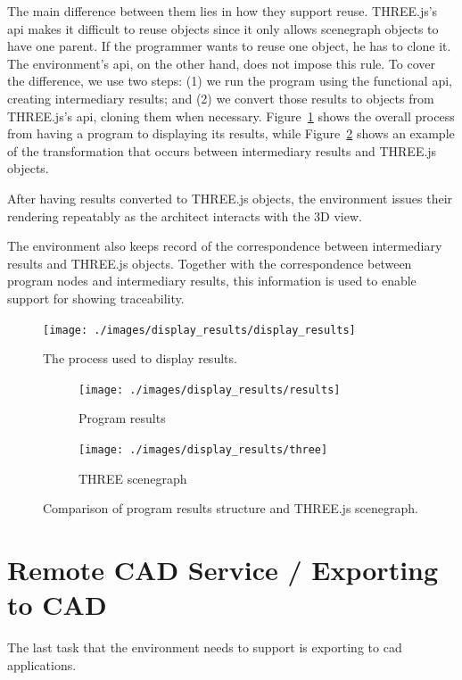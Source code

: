 The main difference between them lies in how they support reuse.
THREE.js's \gls{api} makes it difficult to reuse objects since it only allows scenegraph objects to have one parent.
If the programmer wants to reuse one object, he has to clone it.
The environment's \gls{api}, on the other hand, does not impose this rule.
To cover the difference, we use two steps:
(1) we run the program using the functional \gls{api}, creating intermediary results;
and (2) we convert those results to objects from THREE.js's \gls{api}, cloning them when necessary.
Figure~\ref{fig:display:results} shows the overall process from having a program to displaying its results, while Figure~\ref{fig:results:vs:three} shows an example of the transformation that occurs between intermediary results and THREE.js objects.

After having results converted to THREE.js objects, the environment issues their rendering repeatably as the architect interacts with the 3D view.

The environment also keeps record of the correspondence between intermediary results and THREE.js objects.
Together with the correspondence between program nodes and intermediary results, this information is used to enable support for showing traceability.

\begin{figure}
  \centering
  \texttt{[image: ./images/display\_results/display\_results]}
  \caption{The process used to display results.}
  \label{fig:display:results}
\end{figure}

\begin{figure}
  \centering
  \begin{subfigure}[b]{0.45\textwidth}
    \texttt{[image: ./images/display\_results/results]}
    \caption{Program results}
  \end{subfigure}
  \begin{subfigure}[b]{0.45\textwidth}
    \texttt{[image: ./images/display\_results/three]}
    \caption{THREE scenegraph}
  \end{subfigure}
  \caption{Comparison of program results structure and THREE.js scenegraph.}
  \label{fig:results:vs:three}
\end{figure}


\section{Remote CAD Service / Exporting to CAD}
\label{sec:sol:remote}
The last task that the environment needs to support is exporting to \gls{cad} applications.

